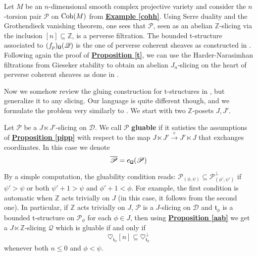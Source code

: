 \begin{exmp}
Let $M$ be an $n$-dimensional smooth complex projective variety and consider the $n$-torsion pair $\mathscr{P}$ on $\textnormal{Coh}(M)$ from \hyperref[cohh]{\textbf{Example \ref*{cohh}}}. Using Serre duality and the Grothendieck vanishing theorem, one sees that $\mathscr{P}$, seen as an abelian $\mathbb{Z}$-slicing via the inclusion $[n] \subseteq \mathbb{Z}$, is a perverse filtration. The bounded t-structure associated to $(f_p)_{\textnormal{\Libra}}(\mathscr{Q})$ is the one of perverse coherent sheaves as constructed in \cite{bez}. Following again the proof of \hyperref[t]{\textbf{Proposition \ref*{t}}}, we can use the Harder-Narasimhan filtrations from Gieseker stability to obtain an abelian $J_n$-slicing on the heart of perverse coherent sheaves as done in \cite{perpol}. 
\end{exmp}

Now we somehow review the gluing construction for t-structures in \cite{del}, but generalize it to any slicing. Our language is quite different though, and we formulate the problem very similarly to \cite{glu}. We start with two $\mathbb{Z}$-posets $J,J'$. 

\begin{defn}
Let $\mathscr{P}$ be a $J \ltimes J'$-slicing on $\mathscr{D}$. We call $\mathscr{P}$ \textbf{gluable} if it satisties the assumptions of \hyperref[pipp]{\textbf{Proposition \ref*{pipp}}} with respect to the map $J \ltimes J' \overset{e}{\longrightarrow} J' \ltimes J$ that exchanges coordinates. In this case we denote $$\overline{\mathscr{P}}=e_{\textnormal{\Libra}}(\mathscr{P})$$
\end{defn}

By a simple computation, the gluability condition reads: $\mathscr{P}_{(\phi,\psi)} \subseteq \mathscr{P}_{(\phi',\psi')}^{\perp}$ if $\psi' > \psi$ or both $\psi'+1>\psi$ and $\phi'+1 < \phi$. For example, the first condition is automatic when $\mathbb{Z}$ acts trivially on $J$ (in this case, it follows from the second one). In particular, if $\mathbb{Z}$ acts trivially on $J$, $\mathscr{P}$ is a $J$-slicing on $\mathscr{D}$ and $\mathfrak{t}_{\phi}$ is a bounded t-structure on $\mathscr{P}_{\phi}$ for each $\phi \in J$, then using \hyperref[aab]{\textbf{Proposition \ref*{aab}}} we get a $J \ltimes \mathbb{Z}$-slicing $\mathscr{Q}$ which is gluable if and only if $$\heartsuit_{\mathfrak{t}_{\psi}}[n] \subseteq \heartsuit_{\mathfrak{t}_{\phi}}^{\perp}$$
whenever both $n \le 0$ and $\phi < \psi$. 

